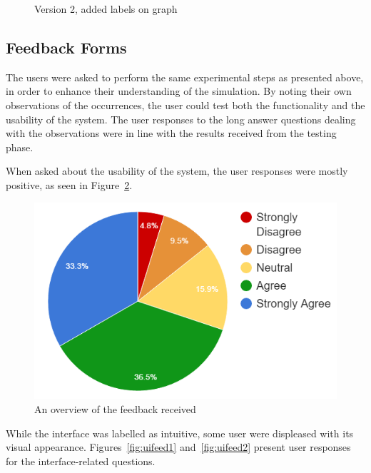 \begin{figure}[!th]
\begin{minipage}[b]{0.23\textwidth}
		\caption{\label{fig:uiv2}Version 2, added labels on graph}
	\end{minipage}
\end{figure}

\subsection{Feedback Forms}
The users were asked to perform the same experimental steps as presented above, in order to enhance their understanding of the simulation. By noting their own observations of the occurrences, the user could test both the functionality and the usability of the system. The user responses to the long answer questions dealing with the observations were in line with the results received from the testing phase.

When asked about the usability of the system, the user responses were mostly positive, as seen in Figure~\ref{fig:genfeed}.
\begin{figure}[!th]
	\centering
	\includegraphics[scale=0.8]{images/genfeed}
	\caption{\label{fig:genfeed}An overview of the feedback received}
\end{figure}

While the interface was labelled as intuitive, some user were displeased with its visual appearance. Figures~\ref{fig:uifeed1} and~\ref{fig:uifeed2} present user responses for the interface-related questions.

